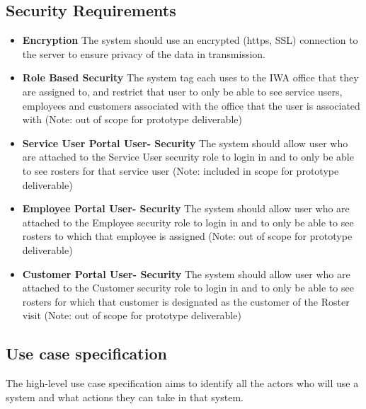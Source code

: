 \documentclass[a4paper,Times New Roman 11pt]{article}
\begin{document}
\begin{samepage}
\subsection {Security Requirements }
\begin{itemize}
\item \textbf{Encryption} The system should use an encrypted (https, SSL) connection to the server to ensure privacy of the data in transmission.
\item \textbf{Role Based Security} The system tag each uses to the IWA office that they are assigned to, and restrict that user to only be able to see service users, employees and customers associated with the office that the user is associated with (Note: out of scope for prototype deliverable)
\item \textbf{Service User Portal User- Security} The system should allow user who are attached to the Service User security role to login in and to only be able to see rosters for that service user (Note: included in scope for prototype deliverable)
\item \textbf{Employee Portal User- Security} The system should allow user who are attached to the Employee security role to login in and to only be able to see rosters to which that employee is assigned (Note: out of scope for prototype deliverable)
\newpage
\item \textbf{Customer Portal User- Security} The system should allow user who are attached to the Customer security role to login in and to only be able to see rosters for which that customer is designated as the customer of the Roster visit (Note: out of scope for prototype deliverable)
\end{itemize}

\subsection {Use case specification}
The high-level use case specification aims to identify all the actors who will use a system and what actions they can take in that system.


\end{samepage}
\end{document}
